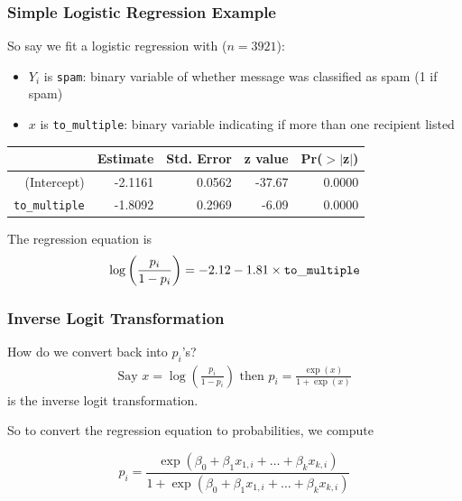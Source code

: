 \documentclass[slides]{beamer}
\newcommand{\blue}[1]{\textcolor{blue2}{#1}}
\begin{document}
\begin{frame}[fragile]
\frametitle{Simple Logistic Regression Example}

So say we fit a logistic regression with ($n=3921$):
\begin{itemize}
\item $Y_i$ is {\tt spam}:  binary variable of whether message was classified as spam (1 if spam)
\item $x$ is {\tt to\_multiple}:  binary variable indicating if more than one recipient listed
\end{itemize}
\pause
\begin{table}[ht]
\centering
\begin{tabular}{r|rrrr}
  \hline
 & Estimate & Std. Error & z value & Pr($>$$|$z$|$) \\ 
  \hline
(Intercept) & -2.1161 & 0.0562 & -37.67 & 0.0000 \\ 
  {\tt to\_multiple} & -1.8092 & 0.2969 & -6.09 & 0.0000 \\ 
   \hline
\end{tabular}
\end{table}

The regression equation is
\[
\log\left(\frac{p_i}{1-p_i}\right) = -2.12 - 1.81 \times {\tt to\_multiple} 
\]

\end{frame}


\begin{frame}[fragile]
\frametitle{Inverse Logit Transformation}
How do we convert back into $p_i$'s?
\pause
\begin{eqnarray*}
\mbox{Say } x = \log\left(\frac{p_i}{1-p_i}\right) \mbox{ then } p_i = \frac{\exp(x)}{1 + \exp(x)}
\end{eqnarray*}
is the \blue{inverse logit transformation}.

\vspace{0.5cm}
\pause
So to convert the regression equation to probabilities, we compute

\[
p_i = \frac{\exp(\beta_0 + \beta_1 x_{1,i} + \ldots + \beta_k x_{k,i})}{1 + \exp(\beta_0 + \beta_1 x_{1,i} + \ldots + \beta_k x_{k,i})}
\]
\end{frame}
\end{document}
